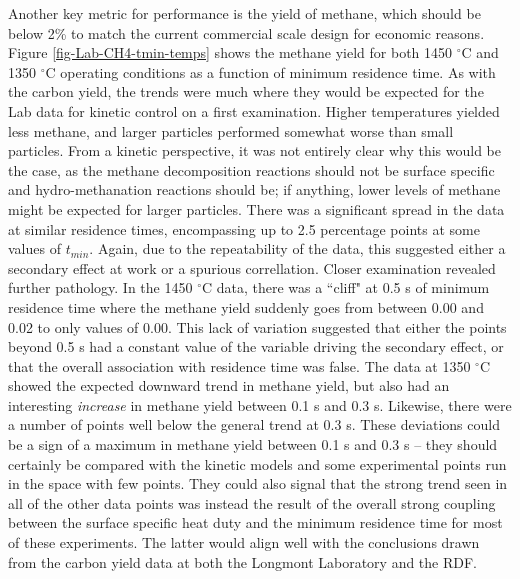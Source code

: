 \documentclass[11pt,twocolumn]{article}
\begin{document}

Another key metric for performance is the yield of methane, which should be below 2\% to match the current commercial scale design for economic reasons.  Figure \ref{fig-Lab-CH4-tmin-temps} shows the methane yield for both 1450 $^{\circ}$C and 1350 $^{\circ}$C operating conditions as a function of minimum residence time.  As with the carbon yield, the trends were much where they would be expected for the Lab data for kinetic control on a first examination.  Higher temperatures yielded less methane, and larger particles performed somewhat worse than small particles.  From a kinetic perspective, it was not entirely clear why this would be the case, as the methane decomposition reactions should not be surface specific and hydro-methanation reactions should be; if anything, lower levels of methane might be expected for larger particles.  There was a significant spread in the data at similar residence times, encompassing up to 2.5 percentage points at some values of $t_{min}$.  Again, due to the repeatability of the data, this suggested either a secondary effect at work or a spurious correllation.  Closer examination revealed further pathology.  In the 1450 $^{\circ}$C data, there was a ``cliff" at 0.5 s of minimum residence time where the methane yield suddenly goes from between 0.00 and 0.02 to only values of 0.00.  This lack of variation suggested that either the points beyond 0.5 s had a constant value of the variable driving the secondary effect, or that the overall association with residence time was false. The data at 1350 $^{\circ}$C showed the expected downward trend in methane yield, but also had an interesting \emph{increase} in methane yield between 0.1 s and 0.3 s.  Likewise, there were a number of points well below the general trend at 0.3 s.  These deviations could be a sign of a maximum in methane yield between 0.1 s and 0.3 s -- they should certainly be compared with the kinetic models and some experimental points run in the space with few points.  They could also signal that the strong trend seen in all of the other data points was instead the result of the overall strong coupling between the surface specific heat duty and the minimum residence time for most of these experiments.  The latter would align well with the conclusions drawn from the carbon yield data at both the Longmont Laboratory and the RDF.
\end{document}
